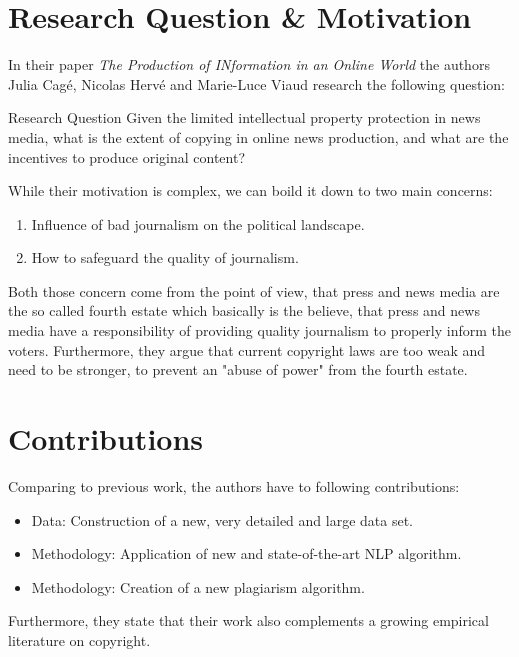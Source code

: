 \documentclass[12pt]{article}
\begin{document}
\maketitle

\section{Research Question \& Motivation}
In their paper \textit{The Production of INformation in an Online World} the
authors Julia Cagé, Nicolas Hervé and Marie-Luce Viaud research the following
question:

\begin{zitat}{Research Question}
  Given the limited intellectual property protection in news media,
  what is the extent of copying in online news production, and what are the
  incentives to produce original content?
\end{zitat}

While their motivation is complex, we can boild it down to two main concerns:
\begin{enumerate}
  \item Influence of bad journalism on the political landscape.
  \item How to safeguard the quality of journalism.
\end{enumerate}

Both those concern come from the point of view, that press and news media are
the so called fourth estate which basically is the believe, that press and
news media have a responsibility of providing quality journalism to properly
inform the voters. Furthermore, they argue that current copyright laws are too
weak and need to be stronger, to prevent an "abuse of power" from the fourth
estate.

\section{Contributions}
Comparing to previous work, the authors have to following contributions:
\begin{itemize}
  \item Data: Construction of a new, very detailed and large data set.
  \item Methodology: Application of new and state-of-the-art NLP algorithm.
  \item Methodology: Creation of a new plagiarism algorithm.
\end{itemize}

Furthermore, they state that their work also complements a growing empirical
literature on copyright.
\end{document}
